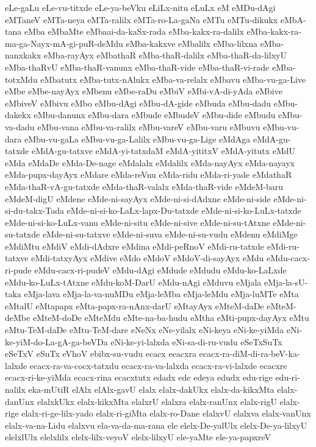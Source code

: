 {eLe-gaLu
eLe-vu-titxde
eLe-ya-beVku
eLiLx-nitu
eLuLx
eM
eMDu-dAgi
eMTaneV
eMTa-neya
eMTa-ralilx
eMTa-ro-La-gaNa
eMTu
eMTu-dikukx
eMbA-tana
eMba
eMbaMte
eMbaai-da-kaSx-rada
eMba-kakx-ra-dalilx
eMba-kakx-ra-ma-ga-Nayx-mA-gi-puR-deMdu
eMba-kakxve
eMbalilx
eMba-lilxna
eMba-nanxkakx
eMba-rayAyx
eMbathaR
eMba-thaR-dalilx
eMba-thaR-da-lilxyU
eMba-thaRvU
eMba-thaR-vanunx
eMba-thaR-vide
eMba-thaR-vi-rade
eMba-totxMdu
eMbatutx
eMba-tutx-nAlukx
eMba-va-relalx
eMbavu
eMba-vu-ga-Live
eMbe
eMbe-nayAyx
eMbenu
eMbe-raDu
eMbiV
eMbi-vA-di-yAda
eMbive
eMbiveV
eMbivu
eMbo
eMbu-dAgi
eMbu-dA-gide
eMbuda
eMbu-dadu
eMbu-dakekx
eMbu-danunx
eMbu-dara
eMbude
eMbudeV
eMbu-dide
eMbudu
eMbu-va-dadu
eMbu-vana
eMbu-va-ralilx
eMbu-vareV
eMbu-varu
eMbuvu
eMbu-vu-dara
eMbu-vu-gaLa
eMbu-vu-ga-Lalilx
eMbu-vu-ga-Lige
eMdAga
eMdA-gu-tatxde
eMdA-gu-tatxve
eMdA-yi-tatxdaM
eMdA-yititxV
eMdA-yitutx
eMdU
eMda
eMdaDe
eMda-De-nage
eMdalalx
eMdalilx
eMda-nayAyx
eMda-nayayx
eMda-pupx-dayAyx
eMdare
eMda-reVnu
eMda-ridu
eMda-ri-yade
eMdathaR
eMda-thaR-vA-gu-tatxde
eMda-thaR-valalx
eMda-thaR-vide
eMdeM-baru
eMdeM-digU
eMdene
eMde-ni-sayAyx
eMde-ni-si-dAdxne
eMde-ni-side
eMde-ni-si-du-takx-Tada
eMde-ni-si-ko-LaLx-lapx-Du-tatxde
eMde-ni-si-ko-LuLx-tatxde
eMde-ni-si-ko-LuLx-vanu
eMde-ni-situ
eMde-ni-sive
eMde-ni-su-tAtxne
eMde-ni-su-tatxde
eMde-ni-su-tatxve
eMde-ni-suva
eMde-ni-su-vudu
eMdenu
eMdiMge
eMdiMtu
eMdiV
eMdi-dAdxre
eMdina
eMdi-peRnoV
eMdi-ru-tatxde
eMdi-ru-tatxve
eMdi-tatxyAyx
eMdive
eMdo
eMdoV
eMdoV-di-sayAyx
eMdu
eMdu-cacx-ri-pude
eMdu-cacx-ri-pudeV
eMdu-dAgi
eMdude
eMdudu
eMdu-ko-LaLxde
eMdu-ko-LuLx-tAtxne
eMdu-koM-DarU
eMdu-nAgi
eMduvu
eMjala
eMja-la-sU-taka
eMja-lava
eMja-la-va-nuMDu
eMja-leMba
eMja-leMdu
eMja-luMTe
eMta
eMtalU
eMtapapx
eMta-papx-ra-nAnx-darU
eMtayAyx
eMteM-daDe
eMteM-deMbe
eMteM-doDe
eMteMdu
eMte-na-ba-hudu
eMtha
eMti-pupx-dayAyx
eMtu
eMtu-TeM-daDe
eMtu-TeM-dare
eNeNx
eNe-yilalx
eNi-keya
eNi-ke-yiMda
eNi-ke-yiM-do-La-gA-ga-beVDa
eNi-ke-yi-lalxda
eNi-sa-di-ru-vudu
eSeTxSuTx
eSeTxV
eSuTx
eVhoV
ebibx-su-vudu
ecacx
ecacxra
ecacx-ra-diM-di-ra-beV-ka-lalxde
ecacx-ra-va-cocx-tatxdu
ecacx-ra-va-lalxda
ecacx-ra-vi-lalxde
ecacxre
ecacx-ri-ke-yiMda
ecacx-rina
ecacxtutx
edadx
ede
edeya
edudx
edu-rige
edu-ri-nalilx
eka-mUtiR
elAlx
elAlx-gavU
elalx
elalx-dakUkx
elalx-da-kikxMta
elalx-danUnx
elalxkUkx
elalx-kikxMta
elalxrU
elalxra
elalx-ranUnx
elalx-rigU
elalx-rige
elalx-ri-ge-lilx-yado
elalx-ri-giMta
elalx-ro-Dane
elalxvU
elalxva
elalx-vanUnx
elalx-va-na-Lidu
elalxvu
ela-va-da-ma-rana
ele
elelx-De-yalUlx
elelx-De-ya-lilxyU
elelxlUlx
elelxlilx
elelx-lilx-veyoV
elelx-lilxyU
ele-yaMte
ele-ya-papxreV
}
